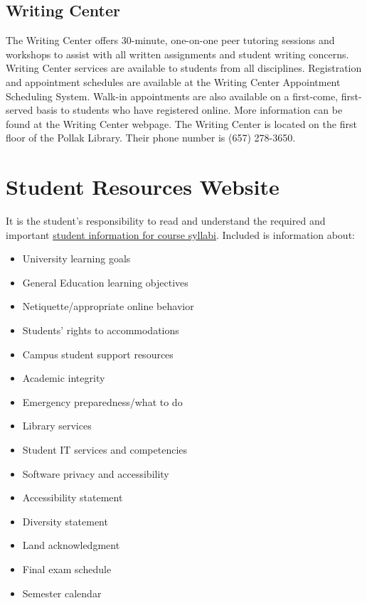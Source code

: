 \documentclass{./../latex/syllabus}
\begin{document}
\subsection*{Writing Center}
The Writing Center offers 30-minute, one-on-one peer tutoring sessions and workshops to assist with all written assignments and student writing concerns. Writing Center services are available to students from all disciplines. Registration and appointment schedules are available at the Writing Center Appointment Scheduling System. Walk-in appointments are also available on a first-come, first-served basis to students who have registered online. More information can be found at the Writing Center webpage. The Writing Center is located on the first floor of the Pollak Library. Their phone number is (657) 278-3650.

\section*{Student Resources Website}

\noindent It is the student's responsibility to read and understand the required and important \href{https://fdc.fullerton.edu/teaching/student-info-syllabi.html}{student information for course syllabi}. Included is information about:
{
\begin{itemize}[nosep]
\item University learning goals
\item General Education learning objectives
\item Netiquette/appropriate online behavior
\item Students' rights to accommodations
\item Campus student support resources
\item Academic integrity
\item Emergency preparedness/what to do
\item Library services
\item Student IT services and competencies
\item Software privacy and accessibility
\item Accessibility statement
\item Diversity statement
\item Land acknowledgment
\item Final exam schedule
\item Semester calendar
\end{itemize}
}
\end{document}

